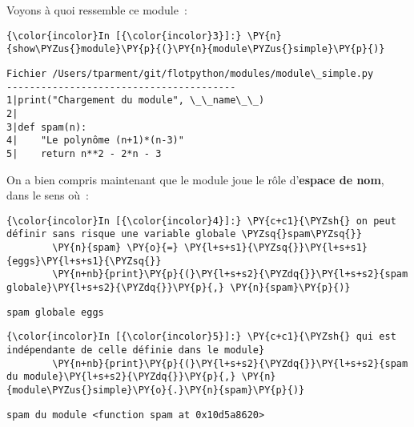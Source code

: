     Voyons à quoi ressemble ce module~:

    \begin{Verbatim}[commandchars=\\\{\}]
{\color{incolor}In [{\color{incolor}3}]:} \PY{n}{show\PYZus{}module}\PY{p}{(}\PY{n}{module\PYZus{}simple}\PY{p}{)}
\end{Verbatim}


    \begin{Verbatim}[commandchars=\\\{\}]
Fichier /Users/tparment/git/flotpython/modules/module\_simple.py
----------------------------------------
1|print("Chargement du module", \_\_name\_\_)
2|
3|def spam(n):
4|    "Le polynôme (n+1)*(n-3)"
5|    return n**2 - 2*n - 3

    \end{Verbatim}

    On a bien compris maintenant que le module joue le rôle d'\textbf{espace
de nom}, dans le sens où~:

    \begin{Verbatim}[commandchars=\\\{\}]
{\color{incolor}In [{\color{incolor}4}]:} \PY{c+c1}{\PYZsh{} on peut définir sans risque une variable globale \PYZsq{}spam\PYZsq{}}
        \PY{n}{spam} \PY{o}{=} \PY{l+s+s1}{\PYZsq{}}\PY{l+s+s1}{eggs}\PY{l+s+s1}{\PYZsq{}}
        \PY{n+nb}{print}\PY{p}{(}\PY{l+s+s2}{\PYZdq{}}\PY{l+s+s2}{spam globale}\PY{l+s+s2}{\PYZdq{}}\PY{p}{,} \PY{n}{spam}\PY{p}{)}
\end{Verbatim}


    \begin{Verbatim}[commandchars=\\\{\}]
spam globale eggs

    \end{Verbatim}

    \begin{Verbatim}[commandchars=\\\{\}]
{\color{incolor}In [{\color{incolor}5}]:} \PY{c+c1}{\PYZsh{} qui est indépendante de celle définie dans le module}
        \PY{n+nb}{print}\PY{p}{(}\PY{l+s+s2}{\PYZdq{}}\PY{l+s+s2}{spam du module}\PY{l+s+s2}{\PYZdq{}}\PY{p}{,} \PY{n}{module\PYZus{}simple}\PY{o}{.}\PY{n}{spam}\PY{p}{)}
\end{Verbatim}


    \begin{Verbatim}[commandchars=\\\{\}]
spam du module <function spam at 0x10d5a8620>

    \end{Verbatim}


